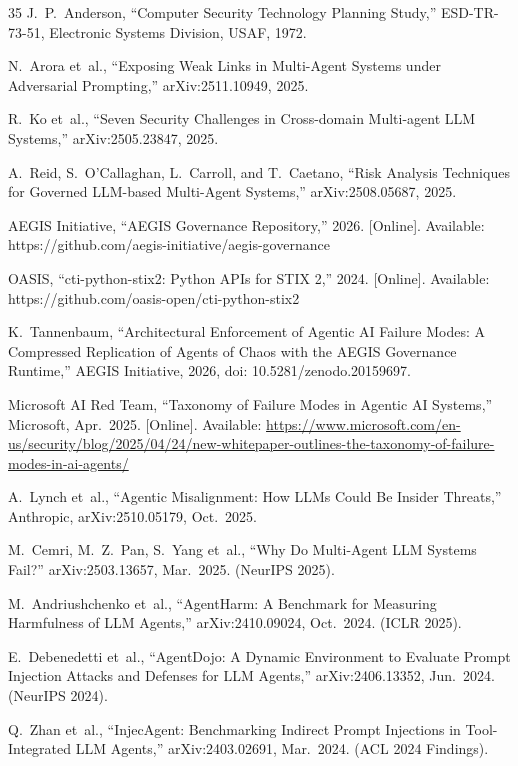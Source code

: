 \documentclass{IEEEoj-data}
\newcommand{\replaced}[2]{#1}
\newcommand{\added}[1]{#1}
\begin{document}
\begin{thebibliography}{35}
J.~P.~Anderson, ``Computer Security Technology Planning Study,'' ESD-TR-73-51, Electronic Systems Division, USAF, 1972.

N.~Arora et~al., ``Exposing Weak Links in Multi-Agent Systems under Adversarial Prompting,'' arXiv:2511.10949, 2025.

R.~Ko et~al., ``Seven Security Challenges in Cross-domain Multi-agent LLM Systems,'' arXiv:2505.23847, 2025.

A.~Reid, S.~O'Callaghan, L.~Carroll, and T.~Caetano, ``Risk Analysis Techniques for Governed LLM-based Multi-Agent Systems,'' arXiv:2508.05687, 2025.

AEGIS Initiative, ``AEGIS Governance Repository,'' 2026. [Online]. Available: https://github.com/aegis-initiative/aegis-governance

OASIS, ``cti-python-stix2: Python APIs for STIX 2,'' 2024. [Online]. Available: https://github.com/oasis-open/cti-python-stix2

\added{K.~Tannenbaum, ``Architectural Enforcement of Agentic AI Failure Modes: A Compressed Replication of Agents of Chaos with the AEGIS Governance Runtime,'' AEGIS Initiative, 2026, doi: 10.5281/zenodo.20159697.}

\added{Microsoft AI Red Team, ``Taxonomy of Failure Modes in Agentic AI Systems,'' Microsoft, Apr.\ 2025. [Online]. Available: }\url{https://www.microsoft.com/en-us/security/blog/2025/04/24/new-whitepaper-outlines-the-taxonomy-of-failure-modes-in-ai-agents/}

\added{A.~Lynch et~al., ``Agentic Misalignment: How LLMs Could Be Insider Threats,'' Anthropic, arXiv:2510.05179, \replaced{Oct.}{Jun.}\ 2025.}

\added{M.~Cemri, \replaced{M.~Z.~Pan}{Y.~Pan}, \replaced{S.~Yang}{Y.~Yang} et~al., ``Why Do Multi-Agent LLM Systems Fail?'' arXiv:2503.13657, Mar.\ 2025. (NeurIPS 2025).}

\added{M.~Andriushchenko et~al., ``AgentHarm: A Benchmark for Measuring Harmfulness of LLM Agents,'' arXiv:2410.09024, Oct.\ 2024. (ICLR 2025).}

\added{E.~Debenedetti et~al., ``AgentDojo: A Dynamic Environment to Evaluate Prompt Injection Attacks and Defenses for LLM Agents,'' arXiv:2406.13352, Jun.\ 2024. (NeurIPS 2024).}

\added{Q.~Zhan et~al., ``InjecAgent: Benchmarking Indirect Prompt Injections in Tool-Integrated LLM Agents,'' arXiv:2403.02691, Mar.\ 2024. (ACL 2024 Findings).}


\end{thebibliography}
\end{document}
